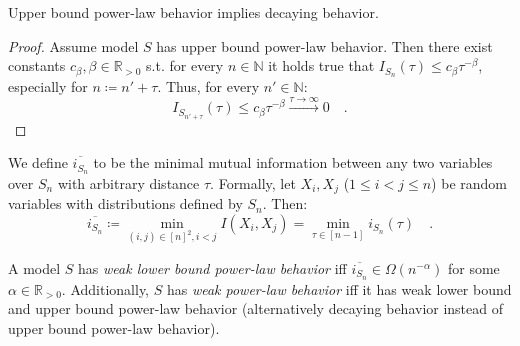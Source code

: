 \documentclass[../../main.tex]{subfiles}
\begin{document}
\pagebreak
    \begin{proposition}
        Upper bound power-law behavior implies decaying behavior.
    \end{proposition}
    \vspace{-2.5em}
    \begin{proof}
        Assume model $S$ has upper bound power-law behavior. Then there exist constants $c_\beta, \beta \in \mathbb{R}_{>0}$ s.t. for every $n \in \mathbb{N}$ it holds true that $I_{S_n}(\tau) \leq c_\beta \tau^{-\beta}$, especially for $n \coloneqq n' + \tau$. Thus, for every $n' \in \mathbb{N}$:
        \[
            I_{S_{n' + \tau}}(\tau) \leq c_\beta \tau^{-\beta} \xrightarrow{\tau \to \infty} 0 \quad .
        \]
    \end{proof}

    \begin{definition}
        We define $\overline{i_{S_n}}$ to be the minimal mutual information between any two variables over $S_n$ with arbitrary distance $\tau$. Formally, let $X_i, X_j$ ($1 \leq i < j \leq n$) be random variables with distributions defined by $S_n$. Then:
        \[
            \overline{i_{S_n}} \coloneqq \min_{(i, j) \in [n]^2, i < j} I(X_i, X_j) = \min_{\tau \in [n - 1]} i_{S_n}(\tau) \quad .
        \]
    \end{definition}

    \begin{definition}
        A model $S$ has \emph{weak lower bound power-law behavior} iff $\overline{i_{S_n}} \in \Omega(n^{-\alpha})$ for some $\alpha \in \mathbb{R}_{>0}$. Additionally, $S$ has \emph{weak power-law behavior} iff it has weak lower bound and upper bound power-law behavior (alternatively decaying behavior instead of upper bound power-law behavior).
    \end{definition}
\end{document}
